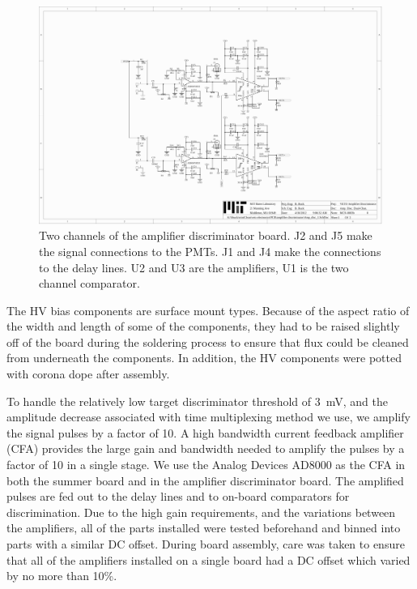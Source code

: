 \documentclass[review,number,sort&compress]{elsarticle}
\begin{document}
\begin{figure}[ht]
\begin{center}
\includegraphics[width=5.5in, keepaspectratio=true, trim=4.54in 2.12in 4.54in 2.12in, clip=true]{graphics/veto_sch.pdf}
\caption{Two channels of the amplifier discriminator board. J2 and J5 make the signal connections to the PMTs. J1 and J4 make the connections to the delay lines. U2 and U3 are the amplifiers, U1 is the two channel comparator.
\label{fig:ampdiscsch}}
\end{center}
\end{figure}

The HV bias components are surface mount types. Because of the aspect
ratio of the width and length of some of the components, they had to
be raised slightly off of the board during the soldering process to
ensure that flux could be cleaned from underneath the components. In
addition, the HV components were potted with corona dope after
assembly.

To handle the relatively low target discriminator threshold of 3~mV,
and the amplitude decrease associated with time multiplexing method we
use, we amplify the signal pulses by a factor of 10.  A high
bandwidth current feedback amplifier (CFA) provides the large gain and
bandwidth needed to amplify the pulses by a factor of 10 in a single
stage. We use the Analog Devices AD8000 as the CFA in both
the summer board and in the amplifier discriminator board. The amplified
pulses are fed out to the delay lines
and to on-board comparators for discrimination.  Due to the high gain
requirements, and the variations between the amplifiers, all of the parts
installed were tested beforehand and binned into parts with a similar
DC offset.  During board assembly, care was taken to ensure that all
of the amplifiers installed on a single board had a DC offset which
varied by no more than 10\%.
\end{document}
